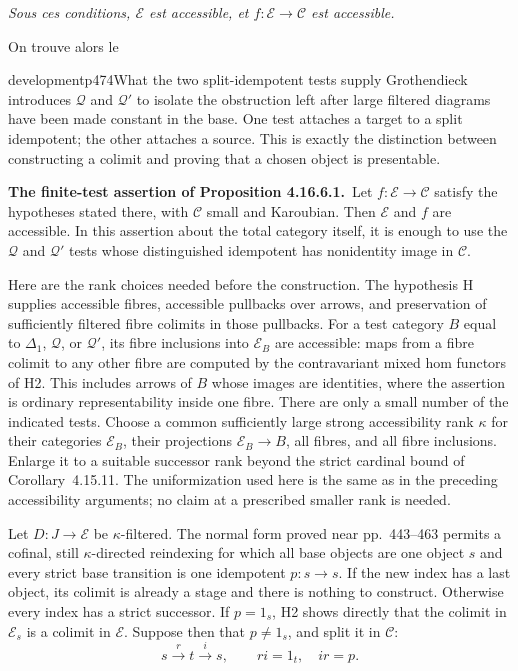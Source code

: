 \textit{Sous ces conditions, $\mathcal{E}$ est accessible, et $f : \mathcal{E} \longrightarrow \mathcal{C}$ est accessible.}

\setcounter{footnote}{195}


On trouve alors le

\begin{dcomment}{development}{p474}{What the two split-idempotent tests supply}
Grothendieck introduces $\mathcal Q$ and $\mathcal Q'$ to isolate the obstruction left after large filtered diagrams have been made constant in the base. One test attaches a target to a split idempotent; the other attaches a source. This is exactly the distinction between constructing a colimit and proving that a chosen object is presentable.

\textbf{The finite-test assertion of Proposition 4.16.6.1.}\ours\
Let $f:\mathcal E\to\mathcal C$ satisfy the hypotheses stated there, with $\mathcal C$ small and Karoubian. Then $\mathcal E$ and $f$ are accessible. In this assertion about the total category itself, it is enough to use the $\mathcal Q$ and $\mathcal Q'$ tests whose distinguished idempotent has nonidentity image in $\mathcal C$.

Here are the rank choices needed before the construction. The hypothesis H supplies accessible fibres, accessible pullbacks over arrows, and preservation of sufficiently filtered fibre colimits in those pullbacks. For a test category $B$ equal to $\Delta_1$, $\mathcal Q$, or $\mathcal Q'$, its fibre inclusions into $\mathcal E_B$ are accessible: maps from a fibre colimit to any other fibre are computed by the contravariant mixed hom functors of H2. This includes arrows of $B$ whose images are identities, where the assertion is ordinary representability inside one fibre. There are only a small number of the indicated tests. Choose a common sufficiently large strong accessibility rank $\kappa$ for their categories $\mathcal E_B$, their projections $\mathcal E_B\to B$, all fibres, and all fibre inclusions. Enlarge it to a suitable successor rank beyond the strict cardinal bound of Corollary~4.15.11. The uniformization used here is the same as in the preceding accessibility arguments; no claim at a prescribed smaller rank is needed.

Let $D:J\to\mathcal E$ be $\kappa$-filtered. The normal form proved near pp.~443--463 permits a cofinal, still $\kappa$-directed reindexing for which all base objects are one object $s$ and every strict base transition is one idempotent $p:s\to s$. If the new index has a last object, its colimit is already a stage and there is nothing to construct. Otherwise every index has a strict successor. If $p=1_s$, H2 shows directly that the colimit in $\mathcal E_s$ is a colimit in $\mathcal E$. Suppose then that $p\ne1_s$, and split it in $\mathcal C$:
\[
 s\xrightarrow{r}t\xrightarrow{i}s,
 \qquad ri=1_t,\quad ir=p.
\]


\end{dcomment}
